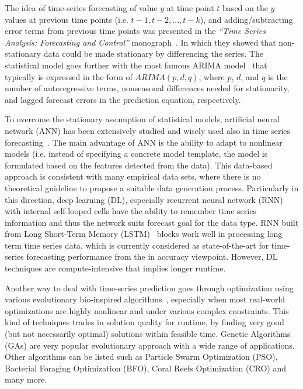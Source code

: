 \documentclass[smallcondensed, natbib]{svjour3}     %
\begin{document}

The idea of time-series forecasting of value $y$ at time point $t$ based on the $y$ values at previous time points (i.e. $t-1, t-2, ..., t-k$), and adding/subtracting error terms from previous time points was presented in the \textit{``Time Series Analysis: Forecasting and Control''} monograph~\citep{box2015time}. In which they showed that non-stationary data could be made stationary by differencing the series. The statistical model goes further with the most famous ARIMA model~\citep{arima} that typically is expressed in the form of $ARIMA(p, d, q)$, where
	$p$, $d$, and $q$ is the number of autoregressive terms, nonseasonal differences needed for stationarity, and lagged forecast errors in the prediction equation, respectively.

To overcome the stationary assumption of statistical models, artificial neural network (ANN) has been extensively studied and wisely used also in time series forecasting~\citep{ref_zhang2}. The main advantage of ANN is the ability to adapt to nonlinear models (i.e. instead of specifying a concrete model template, the model is formulated based on the features detected from the data). This data-based approach is consistent with many empirical data sets, where there is no theoretical guideline to propose a suitable data generation process. Particularly in this direction, deep learning (DL), especially recurrent neural network (RNN)~\citep{ref_rumelhart} with internal self-looped cells have the ability to remember time series information and thus the network suits forecast goal for the data type. RNN built from Long Short-Term Memory (LSTM)~\citep{ref_hochreiter} blocks work well in processing long term time series data, which is currently considered as state-of-the-art for time-series forecasting performance from the in accuracy viewpoint. However, DL techniques are compute-intensive that implies longer runtime.

Another way to deal with time-series prediction goes through optimization using various evolutionary bio-inspired algorithms~\citep{mho}, especially when most real-world optimizations are highly nonlinear and under various complex constraints. This kind of techniques trades in solution quality for runtime, by finding very good (but not necessarily optimal) solutions within feasible time. Genetic Algorithms (GAs) are very popular evolutionary approach with a wide range of applications. Other algorithms can be listed such as Particle Swarm Optimization (PSO), Bacterial Foraging Optimization (BFO), Coral Reefs Optimization (CRO) and many more.
\end{document}

